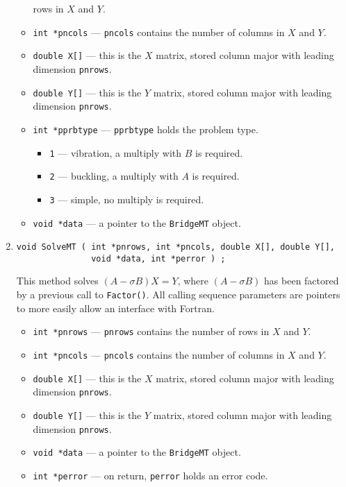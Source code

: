 \begin{enumerate}
\begin{itemize}
      rows in $X$ and $Y$.
\item {\tt int *pncols} --- {\tt *pncols} contains the number of
      columns in $X$ and $Y$.
\item {\tt double X[]} --- this is the $X$ matrix, stored column
      major with leading dimension {\tt *pnrows}.
\item {\tt double Y[]} --- this is the $Y$ matrix, stored column
      major with leading dimension {\tt *pnrows}.
\item {\tt int *pprbtype} --- {\tt *pprbtype} holds the problem type.
   \begin{itemize}
   \item {\tt 1} --- vibration, a multiply with $B$ is required.
   \item {\tt 2} --- buckling, a multiply with $A$ is required.
   \item {\tt 3} --- simple, no multiply is required.
   \end{itemize}
\item {\tt void *data} --- a pointer to the {\tt BridgeMT} object.
\end{itemize}
\item
\begin{verbatim}
void SolveMT ( int *pnrows, int *pncols, double X[], double Y[],
               void *data, int *perror ) ;
\end{verbatim}
This method solves $(A - \sigma B) X = Y$, where 
$(A - \sigma B)$ has been factored by a previous call to {\tt Factor()}.
All calling sequence parameters are pointers to more
easily allow an interface with Fortran.
\begin{itemize}
\item {\tt int *pnrows} --- {\tt *pnrows} contains the number of
      rows in $X$ and $Y$.
\item {\tt int *pncols} --- {\tt *pncols} contains the number of
      columns in $X$ and $Y$.
\item {\tt double X[]} --- this is the $X$ matrix, stored column
      major with leading dimension {\tt *pnrows}.
\item {\tt double Y[]} --- this is the $Y$ matrix, stored column
      major with leading dimension {\tt *pnrows}.
\item {\tt void *data} --- a pointer to the {\tt BridgeMT} object.
\item {\tt int *perror} --- on return, {\tt *perror} holds an
      error code.

\end{itemize}
\end{enumerate}
